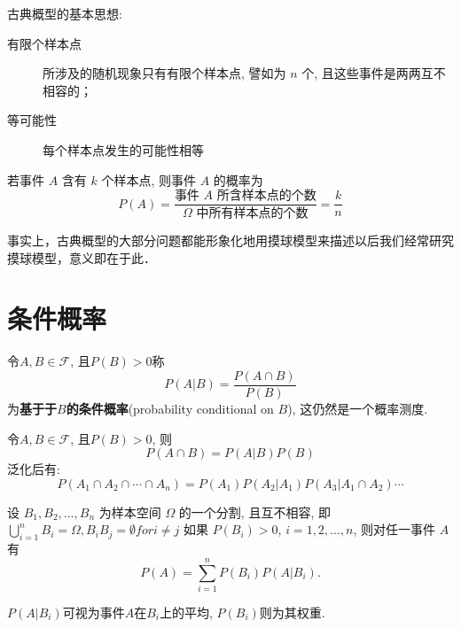 古典概型的基本思想:
\begin{description}
    \item[有限个样本点] 所涉及的随机现象只有有限个样本点, 譬如为 $n$ 个, 且这些事件是两两互不相容的；
    \item[等可能性] 每个样本点发生的可能性相等
\end{description}

\begin{definition}
    若事件 $A$ 含有 $k$ 个样本点, 则事件 $A$ 的概率为
    \[  P (A) = \frac{\text{事件 } A \text{ 所含样本点的个数}}{\Omega \text{ 中所有样本点的个数}} = \frac{k}{n} \]
\end{definition}

\begin{note}
    事实上，古典概型的大部分问题都能形象化地用摸球模型来描述以后我们经常研究摸球模型，意义即在于此．
\end{note}

\section{条件概率}

\begin{definition}[条件概率]
    令$A,B \in \mathscr{F}$, 且$P(B)>0$称
    \[ P(A|B) = \frac{P(A \cap B)}{P(B)}\]
    为\textbf{基于于$B$的条件概率}(probability conditional on $B$), 这仍然是一个概率测度.
\end{definition}

\begin{theorem}[乘法法则]
    令$A,B \in \mathscr{F}$, 且$P(B)>0$, 则
    \[ P(A \cap B) = P(A|B)P(B) \]
    泛化后有:
    \[ P(A_1 \cap A_2 \cap \cdots \cap A_n) = P(A_{1})P(A_2|A_1)P(A_3|A_1\cap A_2) \cdots  \]
\end{theorem}

\begin{theorem}[全概率公式]
    设 $B_1, B_2, \dotsc, B_n$ 为样本空间 $\Omega$ 的一个分割, 且互不相容, 即$\bigcup _{i=1} ^n B_i = \Omega, B_i B_j= \emptyset for i \neq j $
    如果 $P(B_i) > 0$, $i=1, 2, \dotsc, n$,
    则对任一事件 $A$ 有
    \begin{equation}
        P(A) = \sum_{i=1}^n P(B_i) P(A | B_i).
    \end{equation}
\end{theorem}

\begin{note}
    $P(A | B_i)$可视为事件$A$在$B_i$上的平均, $P(B_i)$则为其权重.
\end{note}

